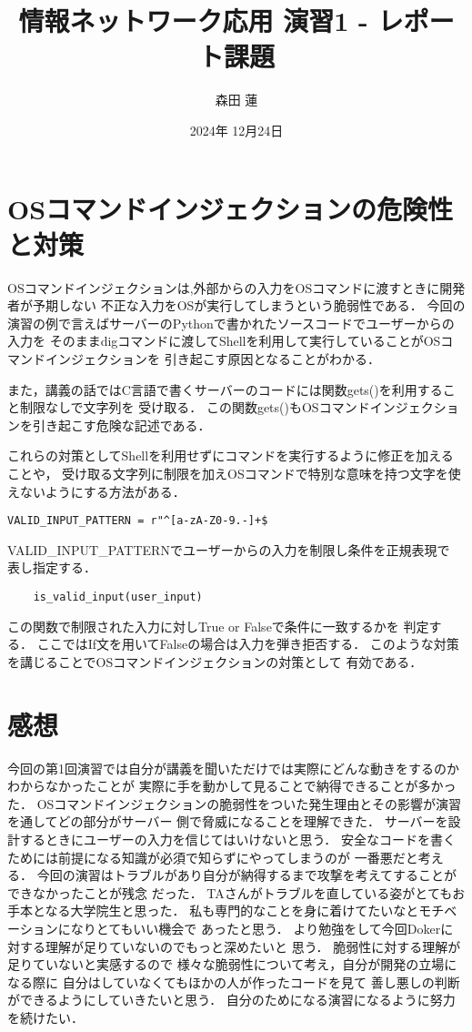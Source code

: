 \documentclass{jlreq}
\title{情報ネットワーク応用 演習1 - レポート課題}
\author{森田 蓮}
\date{2024年 12月24日}
\begin{document}
\maketitle

\section{OSコマンドインジェクションの危険性と対策}
OSコマンドインジェクションは,外部からの入力をOSコマンドに渡すときに開発者が予期しない
不正な入力をOSが実行してしまうという脆弱性である．
今回の演習の例で言えばサーバーのPythonで書かれたソースコードでユーザーからの入力を
そのままdigコマンドに渡してShellを利用して実行していることがOSコマンドインジェクションを
引き起こす原因となることがわかる．

また，講義の話ではC言語で書くサーバーのコードには関数gets()を利用すること制限なしで文字列を
受け取る．
この関数gets()もOSコマンドインジェクションを引き起こす危険な記述である．

これらの対策としてShellを利用せずにコマンドを実行するように修正を加えることや，
受け取る文字列に制限を加えOSコマンドで特別な意味を持つ文字を使えないようにする方法がある．

\begin{verbatim}
VALID_INPUT_PATTERN = r"^[a-zA-Z0-9.-]+$
\end{verbatim}

VALID_INPUT_PATTERNでユーザーからの入力を制限し条件を正規表現で
表し指定する．

\begin{verbatim}
    is_valid_input(user_input)
\end{verbatim}

この関数で制限された入力に対しTrue or Falseで条件に一致するかを
判定する．
ここではIf文を用いてFalseの場合は入力を弾き拒否する．
このような対策を講じることでOSコマンドインジェクションの対策として
有効である．



\section{感想}
今回の第1回演習では自分が講義を聞いただけでは実際にどんな動きをするのかわからなかったことが
実際に手を動かして見ることで納得できることが多かった．
OSコマンドインジェクションの脆弱性をついた発生理由とその影響が演習を通してどの部分がサーバー
側で脅威になることを理解できた．
サーバーを設計するときにユーザーの入力を信じてはいけないと思う．
安全なコードを書くためには前提になる知識が必須で知らずにやってしまうのが
一番悪だと考える．
今回の演習はトラブルがあり自分が納得するまで攻撃を考えてすることができなかったことが残念
だった．
TAさんがトラブルを直している姿がとてもお手本となる大学院生と思った．
私も専門的なことを身に着けてたいなとモチベーションになりとてもいい機会で
あったと思う．
より勉強をして今回Dokerに対する理解が足りていないのでもっと深めたいと
思う．
脆弱性に対する理解が足りていないと実感するので
様々な脆弱性について考え，自分が開発の立場になる際に
自分はしていなくてもほかの人が作ったコードを見て
善し悪しの判断ができるようにしていきたいと思う．
自分のためになる演習になるように努力を続けたい．
\end{document}
